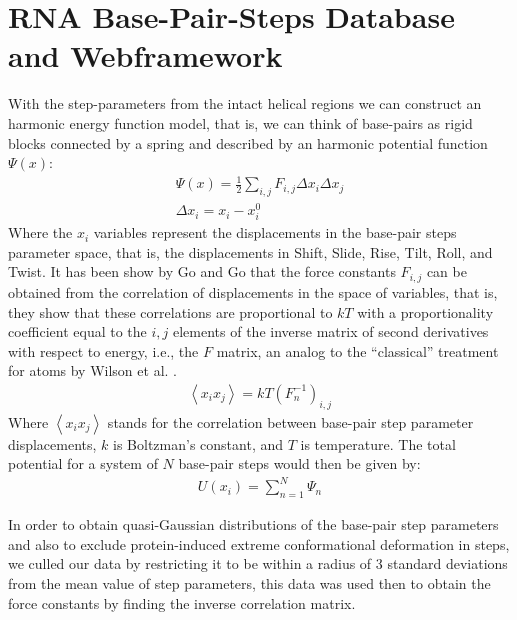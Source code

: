 


\section{RNA Base-Pair-Steps Database and Webframework}
With the step-parameters from the intact helical regions we can
construct an harmonic energy function model, that is, we can think of
base-pairs  as  rigid  blocks  connected  by a spring  and
described by an harmonic potential function $\Psi(x)$:
\begin{gather}
\Psi (x) = \frac{1}{2}\sum_{i,j} F_{i,j} \Delta x_{i} \Delta x_{j}\\
\Delta x_{i}=x_{i}-x_{i}^{0}
\end{gather}  
Where  the  $x_{i}$  variables  represent  the  displacements  in  the
base-pair steps parameter space,  that is, the displacements in Shift,
Slide, Rise,  Tilt, Roll,  and Twist. It  has been  show by Go  and Go
\cite{go1976} that the force  constants $F_{i,j}$ can be obtained from
the correlation of  displacements in the space of  variables, that is,
they show that these correlations are proportional to $kT$ with a
proportionality coefficient equal to the $i,j$ elements of the inverse
matrix of  second derivatives  with respect to  energy, i.e.,   the $F$
matrix, an analog to the ``classical'' treatment for atoms by Wilson et
al. \cite{wilson1955}.
\begin{gather}
\left<x_i x_j\right> = kT (F_{n}^{-1})_{i,j}
\end{gather}
Where $\left< x_i  x_j \right>$ stands for  the correlation between  base-pair step
parameter  displacements,  $k$  is  Boltzman's constant,  and  $T$  is
temperature. The total potential for a system of $N$ base-pair steps would
then be given by:
\begin{gather}
U(x_{i}) = \sum_{n=1}^{N} \Psi_{n}
\end{gather}

In order to obtain  quasi-Gaussian distributions of the base-pair step
parameters and also  to exclude protein-induced extreme conformational
deformation  in steps,  we culled  our data  by restricting  it  to be
within a radius  of 3 standard deviations from the  mean value of step
parameters, this data  was used then to obtain  the force constants by
finding the inverse correlation matrix.

